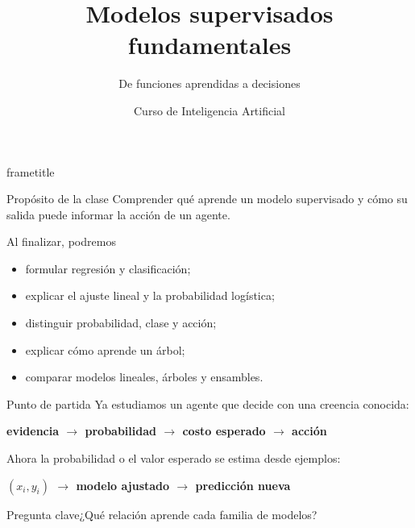 \documentclass[aspectratio=169,10pt]{beamer}
\title[IA · Clase 5]{Modelos supervisados fundamentales}
\subtitle{De funciones aprendidas a decisiones}
\author{Curso de Inteligencia Artificial}
\institute{Semana 5 · Clase 5}
\date{}
\newcommand{\concepto}[1]{\textcolor{UAPTeal}{\textbf{#1}}}
\newcommand{\pregunta}[1]{\begin{block}{Pregunta clave}#1\end{block}}
\begin{document}
\begin{frame}[plain]
  \begin{beamercolorbox}[wd=\paperwidth,ht=\paperheight,sep=2em]{frametitle}
    \vfill
    {\Huge\bfseries\inserttitle\par}\vspace{.45em}
    {\color{UAPGold}\Large\insertsubtitle\par}\vspace{1.2em}
    \par
    \vfill {\color{UAPGold}\large\insertauthor\par}{\color{white}\insertinstitute\par}
  \end{beamercolorbox}
\end{frame}

\begin{frame}{Propósito de la clase}
  Comprender qué aprende un modelo supervisado y cómo su salida puede informar la acción de un agente.
  \begin{block}{Al finalizar, podremos}
    \begin{itemize}
      \item formular regresión y clasificación;
      \item explicar el ajuste lineal y la probabilidad logística;
      \item distinguir probabilidad, clase y acción;
      \item explicar cómo aprende un árbol;
      \item comparar modelos lineales, árboles y ensambles.
    \end{itemize}
  \end{block}
\end{frame}

\begin{frame}{Punto de partida}
  \small
  Ya estudiamos un agente que decide con una creencia conocida:
  \begin{center}\concepto{evidencia $\rightarrow$ probabilidad $\rightarrow$ costo esperado $\rightarrow$ acción}\end{center}
  Ahora la probabilidad o el valor esperado se estima desde ejemplos:
  \begin{center}\concepto{$(x_i,y_i)$ $\rightarrow$ modelo ajustado $\rightarrow$ predicción nueva}\end{center}
  \pregunta{¿Qué relación aprende cada familia de modelos?}
\end{frame}
\end{document}
